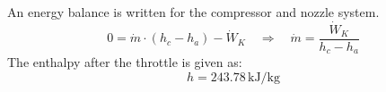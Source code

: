 An energy balance is written for the compressor and nozzle system.  
\[
0 = \dot{m} \cdot (h_c - h_a) - \dot{W}_K \quad \Rightarrow \quad \dot{m} = \frac{\dot{W}_K}{h_c - h_a}
\]  
The enthalpy after the throttle is given as:  
\[
h = 243.78 \, \text{kJ/kg}
\]